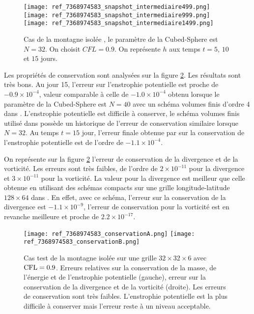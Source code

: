 \begin{figure}[htbp]
\begin{center}
\texttt{[image: ref\_7368974583\_snapshot\_intermediaire499.png]}\\
\texttt{[image: ref\_7368974583\_snapshot\_intermediaire999.png]}\\
\texttt{[image: ref\_7368974583\_snapshot\_intermediaire1499.png]}
\end{center}
\caption{Cas de la montagne isolée \cite{Williamson1992}, le paramètre de la Cubed-Sphere est $N=32$. On choisit $CFL=0.9$.  On représente $h$ aux temps $t=5$, $10$ et $15$ jours.}
\label{fig: williamson 5 space height}
\end{figure}

Les propriétés de conservation sont analysées sur la figure \ref{fig: williamson 5 conservation}. Les résultats sont très bons. Au jour 15, l'erreur sur l'enstrophie potentielle est proche de $-0.9 \times 10^{-4}$, valeur comparable à celle de $-1.0 \times 10^{-4}$ obtenu lorsque le paramètre de la Cubed-Sphere est $N=40$ avec un schéma volumes finis d'ordre 4 dans \cite{Ullrich2010}. L'enstrophie potentielle est difficile à conserver, le schéma volumes finis utilisé dans \cite{Chen2008} possède un historique de l'erreur de conservation similaire lorsque $N=32$. Au temps $t=15$ jour, l'erreur finale obtenue par \cite{Chen2008} sur la conservation de l'enstrophie potentielle est de l'ordre de $-1.1 \times 10^{-4}$.

On représente sur la figure \ref{fig: williamson 5 conservation} l'erreur de conservation de la divergence et de la vorticité. Les erreurs sont très faibles, de l'ordre de $2 \times 10^{-11}$ pour la divergence et $3 \times 10^{-11}$ pour la vorticité. La valeur pour la divergence est meilleur que celle obtenue en utilisant des schémas compacts sur une grille longitude-latitude $128 \times 64$ dans \cite{Nihei2003}. En effet, avec ce schéma, l'erreur sur la conservation de la divergence est $-1.1 \times 10^{-9}$, l'erreur de conservation pour la vorticité est en revanche meilleure et proche de $2.2 \times 10^{-17}$. 

\begin{figure}[htbp]
\begin{center}
\texttt{[image: ref\_7368974583\_conservationA.png]}
\texttt{[image: ref\_7368974583\_conservationB.png]}
\end{center}
\caption{Cas test de la montagne isolée \cite{Williamson1992} sur une grille $32 \times 32 \times 6$ avec $\text{CFL}=0.9$. Erreurs relatives sur la conservation de la masse, de l'énergie et de l'enstrophie potentielle (gauche), erreur sur la conservation de la divergence et de la vorticité (droite). Les erreurs de conservation sont très faibles. L'enstrophie potentielle est la plus difficile à conserver mais l'erreur reste à un niveau acceptable.}
\label{fig: williamson 5 conservation}
\end{figure}

